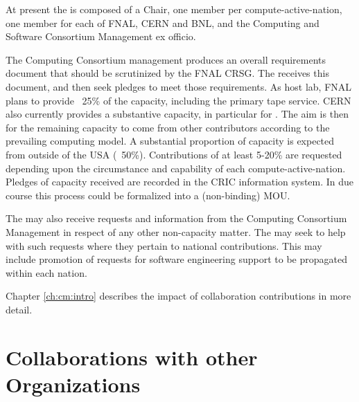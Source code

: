\documentclass[../main-v1.tex]{subfiles}
\begin{document}
At present the  is composed of a Chair, one member per compute-active-nation, one member for each of FNAL, CERN and BNL, and the Computing and Software Consortium  Management ex officio.

The Computing Consortium management produces an overall requirements document that should be scrutinized by the FNAL CRSG. The  receives this document, and then seek pledges to meet those requirements. As host lab, FNAL plans to provide ~25\% of the capacity, including the primary tape service.
CERN also currently provides a substantive capacity, in particular for .
The aim is then for the remaining capacity to come from other contributors according to the prevailing computing model. A substantial proportion of capacity is expected from outside of the USA  (~50\%). Contributions of at least 5-20\% are requested depending upon the circumstance and capability of each compute-active-nation.
Pledges of capacity received are recorded in the CRIC information system. In due course this process could be formalized into a (non-binding) MOU.

The  may also receive requests and information from the Computing Consortium Management in respect of any other non-capacity matter. The  may seek to help with such requests where they pertain to national contributions. This may include promotion of requests for software engineering support to be propagated within each nation.  

Chapter \ref{ch:cm:intro} describes the impact of  collaboration contributions in more detail. 

\section{Collaborations with other Organizations}



\end{document}
